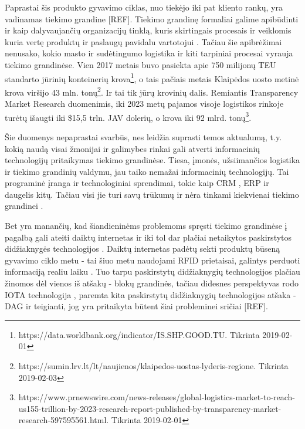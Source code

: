 Paprastai šis produkto gyvavimo ciklas, nuo tiekėjo iki pat kliento rankų, yra vadinamas tiekimo grandine [REF]. Tiekimo grandinę formaliai galime apibūdinti ir kaip dalyvaujančių organizacijų tinklą, kuris skirtingais procesais ir veiklomis kuria vertę produktų ir paslaugų pavidalu vartotojui \cite{christopher2016logistics}. Tačiau šie apibrėžimai nenusako, kokio masto ir sudėtingumo logistika ir kiti tarpiniai procesai vyrauja tiekimo grandinėse. Vien 2017 metais buvo pasiekta apie 750 milijonų TEU standarto jūrinių konteinerių krova\footnote{https://data.worldbank.org/indicator/IS.SHP.GOOD.TU. Tikrinta 2019-02-01}, o tais pačiais metais Klaipėdos uosto metinė krova viršijo 43 mln. tonų\footnote{https://sumin.lrv.lt/lt/naujienos/klaipedos-uostas-lyderis-regione. Tikrinta 2019-02-03}. Ir tai tik jūrų krovinių dalis. Remiantis Transparency Market Research duomenimis, iki 2023 metų pajamos visoje logistikos rinkoje turėtų išaugti iki \$15,5 trln. JAV dolerių, o krova iki 92 mlrd. tonų\footnote{https://www.prnewswire.com/news-releases/global-logistics-market-to-reach-us155-trillion-by-2023-research-report-published-by-transparency-market-research-597595561.html. Tikrinta 2019-02-01}.

Šie duomenys nepaprastai svarbūs, nes leidžia suprasti temos aktualumą, t.y. kokią naudą visai žmonijai ir galimybes rinkai gali atverti informacinių technologijų pritaikymas tiekimo grandinėse. Tiesa, įmonės, užsiimančios logistika ir tiekimo grandinių valdymu, jau taiko nemažai informacinių technologijų. Tai programinė įranga ir technologiniai sprendimai, tokie kaip CRM \cite{bharati2015current}, ERP \cite{neubert2018collaboration} ir daugelis kitų. Tačiau visi jie turi savų trūkumų ir nėra tinkami kiekvienai tiekimo grandinei \cite{garg2018supply}.

Bet yra manančių, kad šiandieninėms problemoms spręsti tiekimo grandinėse į pagalbą gali ateiti daiktų internetas \cite{dweekat2017supply} ir iki tol dar plačiai netaikytos paskirstytos didžiaknygės technologijos \cite{abeyratne2016blockchain}. Daiktų internetas padėtų sekti produktų būseną gyvavimo ciklo metu - tai šiuo metu naudojami RFID prietaisai, galintys perduoti informaciją realiu laiku \cite{majeed2017internet}. Tuo tarpu paskirstytų didžiaknygių technologijos plačiau žinomos dėl vienos iš atšakų - blokų grandinės, tačiau didesnes perspektyvas rodo IOTA technologija \cite{popov2016tangle}, paremta kita paskirstytų didžiaknygių technologijos atšaka - DAG ir teigianti, jog yra pritaikyta būtent šiai probleminei sričiai [REF]. 

